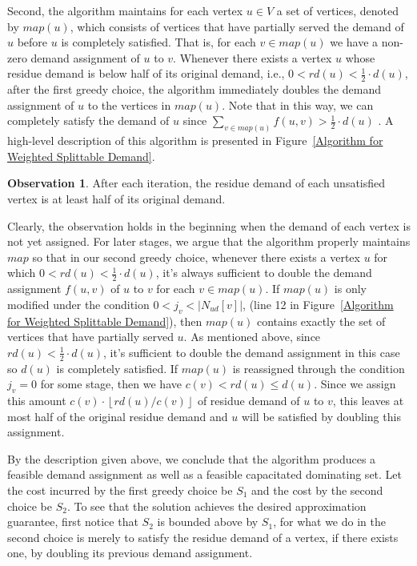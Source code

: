 \documentclass[a4paper,11pt]{article}
\theoremstyle{definition}
\newtheorem{observation}{Observation}
\begin{document}
Second, the algorithm maintains for each vertex $u \in V$ a set of vertices, denoted by $map(u)$, which consists of vertices that have partially served the demand of $u$ before $u$ is completely satisfied. 
That is, for each $v \in map(u)$ we have a non-zero demand assignment of $u$ to $v$. Whenever there exists a vertex $u$ whose residue demand is below half of its original demand, i.e., $0 < rd(u) < \frac{1}{2}\cdot d(u)$, after the first greedy choice, the algorithm immediately doubles the demand assignment of $u$ to the vertices in $map(u)$. Note that in this way, we can completely satisfy the demand of $u$ since $\sum_{v \in map(u)} f(u,v) > \frac{1}{2}\cdot d(u)$ . A high-level description of this algorithm is presented in Figure~\ref{Algorithm for
Weighted Splittable Demand}.

\begin{observation} \label{observation_splittable_half}
After each iteration, the residue demand of each unsatisfied vertex is at least half of its original demand.
\end{observation}

Clearly, the observation holds in the beginning when the demand of each vertex is not yet assigned. For later stages, we argue that the algorithm properly maintains $map$ so that in our second greedy choice, whenever there exists a vertex $u$ for which $0 < rd(u) < \frac{1}{2}\cdot d(u)$, it's always sufficient to double the demand assignment $f(u,v)$ of $u$ to $v$ for each $v \in map(u)$. If $map(u)$ is only modified under the condition $0<j_v<\left|N_{ud}[v]\right|$, (line 12 in Figure~\ref{Algorithm for Weighted Splittable Demand}), then $map(u)$ contains exactly the set of vertices that have partially served $u$. As mentioned above, since $rd(u) < \frac{1}{2}\cdot d(u)$, it's sufficient to double the demand assignment in this case so $d(u)$ is completely satisfied. If $map(u)$ is reassigned through the condition $j_v = 0$ for some stage, then we have $c(v)<rd(u)\le d(u)$. Since we assign this amount $c(v)\cdot \left\lfloor rd(u)/c(v)\right\rfloor$ of residue demand of $u$ to $v$, this leaves at most half of the original residue demand and $u$ will be satisfied by doubling this assignment.

\smallskip

By the description given above, we conclude that the algorithm produces a feasible demand assignment as well as a feasible capacitated dominating set. Let the cost incurred by the first greedy choice be $S_1$ and the cost by the second choice be $S_2$. To see that the solution achieves the desired approximation guarantee, first notice that $S_2$ is bounded above by $S_1$, for what we do in the second choice is merely to satisfy the residue demand of a vertex, if there exists one, by doubling its previous demand assignment.
\end{document}
